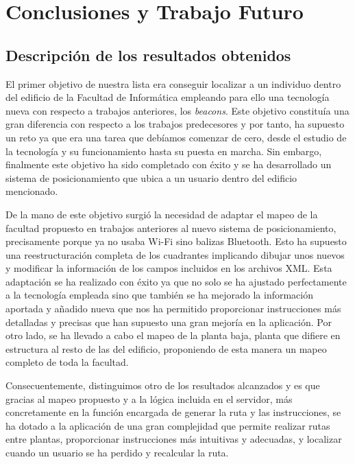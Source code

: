 \chapter{Conclusiones y Trabajo Futuro}
\label{cap:conclusiones}

\section{Descripción de los resultados obtenidos}
El primer objetivo de nuestra lista era conseguir localizar a un individuo dentro del edificio de la Facultad de Informática empleando para ello una tecnología nueva con respecto a trabajos anteriores, los \textit{beacons}. Este objetivo constituía una gran diferencia con respecto a los trabajos predecesores y por tanto, ha
supuesto un reto ya que era una tarea que debíamos comenzar de cero, desde el estudio de la tecnología y su funcionamiento hasta su puesta en marcha. Sin embargo, finalmente este objetivo ha sido completado con éxito y se ha desarrollado un sistema de posicionamiento que ubica a un usuario dentro del edificio mencionado.

De la mano de este objetivo surgió la necesidad de adaptar el mapeo de la facultad propuesto en trabajos anteriores al nuevo sistema de posicionamiento, precisamente porque ya no usaba Wi-Fi sino balizas Bluetooth. Esto ha supuesto una reestructuración completa de los cuadrantes implicando dibujar unos nuevos y modificar la información de los campos incluidos en los archivos XML. Esta adaptación se ha realizado con éxito ya que no solo se ha ajustado perfectamente a la tecnología empleada sino que también se ha mejorado la información aportada y añadido nueva que nos ha permitido proporcionar instrucciones más detalladas y precisas que han supuesto una gran mejoría en la aplicación. Por otro lado, se ha llevado a cabo el mapeo de la planta baja, planta que difiere en estructura al resto de las del edificio, proponiendo de esta manera un mapeo completo de toda la facultad.

Consecuentemente, distinguimos otro de los resultados alcanzados y es que gracias al mapeo propuesto y a la lógica incluida en el servidor, más concretamente en la función encargada de generar la ruta y las instrucciones, se ha dotado a la aplicación de una gran complejidad que permite realizar rutas entre plantas, proporcionar instrucciones más intuitivas y adecuadas, y localizar cuando un usuario se ha perdido y recalcular la ruta.

